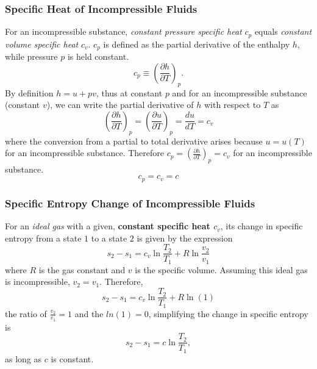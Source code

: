 \subsubsection{Specific Heat of Incompressible Fluids}
For an incompressible substance, \emph{constant pressure specific heat} $c_p$ equals \emph{constant volume specific heat} $c_v$. $c_p$ is defined as the partial derivative of the enthalpy $h$, while pressure $p$ is held constant.
    \begin{equation*}
        c_p \equiv \left(\frac{\partial h}{\partial T}\right)_p.
    \end{equation*}
By definition $h = u+pv$, thus at constant $p$ and for an incompressible substance (constant $v$), we can write the partial derivative of $h$ with respect to $T$ as
    \begin{equation*}
        \left(\frac{\partial h}{\partial T}\right)_p = \left(\frac{\partial u}{\partial T}\right)_p = \frac{du}{dT} = c_v
    \end{equation*}
where the conversion from a partial to total derivative arises because $u = u(T)$ for an incompressible substance. Therefore $c_p = \left(\frac{\partial h}{\partial T}\right)_p = c_v$ for an incompressible substance.
    \begin{equation*}
        c_p = c_v = c
    \end{equation*}
\subsubsection{Specific Entropy Change of Incompressible Fluids}
For an \emph{ideal gas} with a given, \textbf{constant specific heat $c_v$}, its change in specific entropy from a state $1$ to a state $2$ is given by the expression
    \begin{equation*}
        s_2 - s_1 = c_v\ln\frac{T_2}{T_1}+ R \ln\frac{v_2}{v_1}
    \end{equation*}
where $R$ is the gas constant and $v$ is the specific volume. Assuming this ideal gas is incompressible, $v_2=v_1$.  Therefore, 
    \begin{equation*}
        s_2 - s_1 = c_v\ln\frac{T_2}{T_1}+ R \ln(1)
    \end{equation*}
the ratio of $\frac{v_2}{v_1}=1$ and the $ln(1)=0$, simplifying the change in specific entropy is 
    \begin{equation*}
        s_2 - s_1 = c\ln\frac{T_2}{T_1},
    \end{equation*}
as long as $c$ is constant.
    


